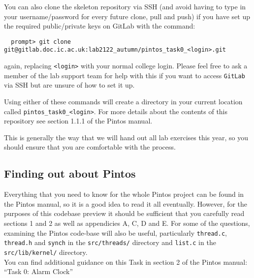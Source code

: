 \documentclass[a4paper,12pt]{article}
\newcommand{\shell}[1]{\lstinline!#1!}
\begin{document}
You can also clone the skeleton repository via SSH (and avoid having to type in your username/password for every future clone, pull and push) if you have set up the required public/private keys on GitLab with the command:
%
\begin{lstlisting}
  prompt> git clone git@gitlab.doc.ic.ac.uk:lab2122_autumn/pintos_task0_<login>.git
\end{lstlisting}
%
again, replacing \shell{<login>} with your normal college login.
Please feel free to ask a member of the lab support team for help with this if you want to access \shell{GitLab} via SSH but are unsure of how to set it up.

Using either of these commands will create a directory in your current location called \shell{pintos_task0_<login>}.
For more details about the contents of this repository see section 1.1.1 of the Pintos manual.

This is generally the way that we will hand out all lab exercises this year, so you should ensure that you are comfortable with the process.


\subsection*{Finding out about Pintos}
Everything that you need to know for the whole Pintos project can be found in the Pintos manual, 
so it is a good idea to read it all eventually.
However, for the purposes of this codebase preview it should be sufficient that you carefully read sections 1 and 2 
as well as appendicies A, C, D and E. 
For some of the questions, examining the Pintos code-base will also be useful, 
particularly \shell{thread.c}, \shell{thread.h} and \shell{synch} in the \shell{src/threads/} directory
and \shell{list.c} in the \shell{src/lib/kernel/} directory.\\

\noindent You can find additional guidance on this Task in section 2 of the Pintos manual: ``Task 0: Alarm Clock''
\end{document}
